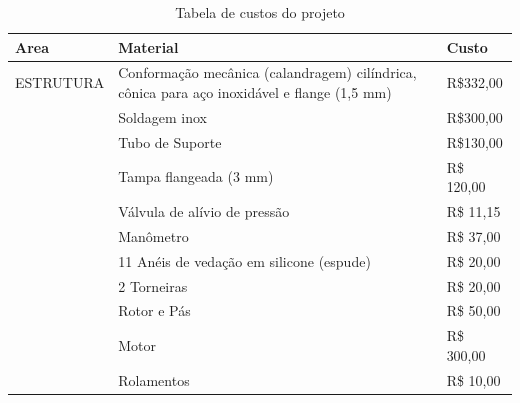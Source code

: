 \begin{table}[h]
\centering
\caption{Tabela de custos do projeto}
\resizebox{\textwidth}{!} {
\label{table1}
\begin{tabular}{ll|l|}
\hline
\multicolumn{1}{|l|}{Area}                     & Material                                                                                    & Custo              \\ \hline
\multicolumn{1}{|l|}{ESTRUTURA}                & Conformação mecânica (calandragem) cilíndrica, cônica para aço inoxidável e flange (1,5 mm) & R\$332,00          \\ \hline
\multicolumn{1}{|l|}{}                         & Soldagem inox                                                                               & R\$300,00          \\ \hline
\multicolumn{1}{|l|}{}                         & Tubo de Suporte                                                                             & R\$130,00          \\ \hline
\multicolumn{1}{|l|}{}                         & Tampa flangeada (3 mm)                                                                      & R\$ 120,00         \\ \hline
\multicolumn{1}{|l|}{}                         & Válvula de alívio de pressão                                                                & R\$ 11,15          \\ \hline
\multicolumn{1}{|l|}{}                         & Manômetro                                                                                   & R\$ 37,00          \\ \hline
\multicolumn{1}{|l|}{}                         & 11 Anéis de vedação em silicone (espude)                                                    & R\$ 20,00          \\ \hline
\multicolumn{1}{|l|}{}                         & 2 Torneiras                                                                                 & R\$ 20,00          \\ \hline
\multicolumn{1}{|l|}{}                         & Rotor e Pás                                                                                 & R\$ 50,00          \\ \hline
\multicolumn{1}{|l|}{}                         & Motor                                                                                       & R\$ 300,00         \\ \hline
\multicolumn{1}{|l|}{}                         & Rolamentos                                                                                  & R\$ 10,00          \\ \hline

\end{tabular}}
\end{table}
